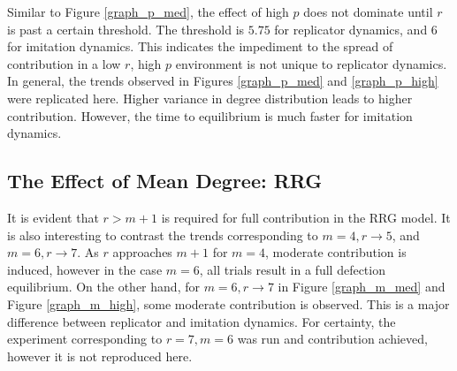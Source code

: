 \FloatBarrier

 Similar to Figure \ref{graph_p_med}, the effect of high $p$ does not dominate until $r$ is past a certain threshold. The threshold is $5.75$ for replicator dynamics, and $6$ for imitation dynamics. This indicates the impediment to the spread of contribution in a low $r$, high $p$ environment is not unique to replicator dynamics. \\
 
 In general, the trends observed in Figures \ref{graph_p_med} and \ref{graph_p_high} were replicated here. Higher variance in degree distribution leads to higher contribution. However, the time to equilibrium is much faster for imitation dynamics.
 \newpage
\subsection{The Effect of Mean Degree: RRG}

 \FloatBarrier

 \FloatBarrier



 \FloatBarrier

It is evident that $r>m+1$ is required for full contribution in the RRG model. It is also interesting  to contrast the trends corresponding to $m=4, r \to 5$, and $m=6, r \to 7$. As $r$ approaches $m+1$ for $m=4$, moderate contribution is induced, however in the case $m=6$, all trials result in a full defection equilibrium. On the other hand, for $m = 6, r \to 7$ in Figure \ref{graph_m_med} and Figure \ref{graph_m_high}, some moderate contribution is observed. This is a major difference between replicator and imitation dynamics. For certainty, the experiment corresponding to $r=7, m =6$ was run and contribution achieved, however it is not reproduced here. 


